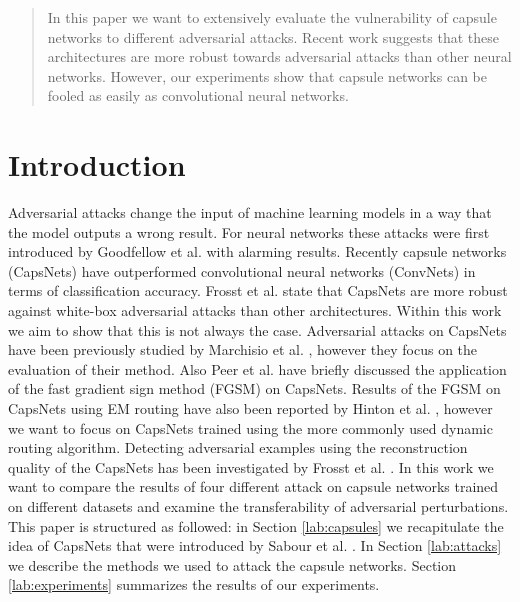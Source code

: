 \documentclass{article}
\begin{document}
\begin{abstract}
	In this paper we want to extensively evaluate the vulnerability of capsule networks to different adversarial attacks. Recent work suggests that these architectures are more robust towards adversarial attacks than other neural networks. However, our experiments show that capsule networks can be fooled as easily as convolutional neural networks.
\end{abstract}

\section{Introduction}
Adversarial attacks change the input of machine learning models in a way that the model outputs a wrong result. For neural networks these attacks were first introduced by Goodfellow et al.  with alarming results. Recently capsule networks (CapsNets) \cite{capsules} have outperformed convolutional neural networks (ConvNets) in terms of classification accuracy. Frosst et al.  state that CapsNets are more robust against white-box adversarial attacks than other architectures. Within this work we aim to show that this is not always the case. Adversarial attacks on CapsNets have been previously studied by Marchisio et al. , however they focus on the evaluation of their method. Also Peer et al.  have briefly discussed the application of the fast gradient sign method (FGSM) \cite{fgsm} on CapsNets. Results of the FGSM on CapsNets using EM routing have also been reported by Hinton et al. , however we want to focus on CapsNets trained using the more commonly used dynamic routing algorithm. Detecting adversarial examples using the reconstruction quality of the CapsNets has been investigated by Frosst et al. . In this work we want to compare the results of four different attack on capsule networks trained on different datasets and examine the transferability of adversarial perturbations. This paper is structured as followed: in Section \ref{lab:capsules} we recapitulate the idea of CapsNets that were introduced by Sabour et al. . In Section \ref{lab:attacks} we describe the methods we used to attack the capsule networks. Section \ref{lab:experiments} summarizes the results of our experiments.
\end{document}
